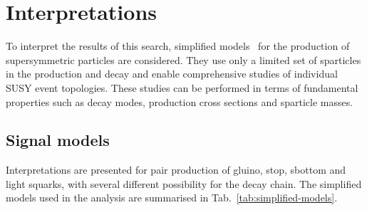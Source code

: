 \section{Interpretations}
\label{sec:susy}

To interpret the results of this search, simplified
models~\cite{Alwall:2008ag,Alwall:2008va,Alves:2011wf} for the
production of supersymmetric particles are considered.  They use only
a limited set of sparticles in the production and decay and enable
comprehensive studies of individual SUSY event topologies. These
studies can be performed in terms of fundamental properties such as
decay modes, production cross sections and sparticle masses.

\subsection{Signal models}
\label{sec:susy_models}

Interpretations are presented for pair production of gluino, stop,
sbottom and light squarks, with several different possibility for the
decay chain.  The simplified models used in the analysis are
summarised in Tab.~\ref{tab:simplified-models}. %
%
%


